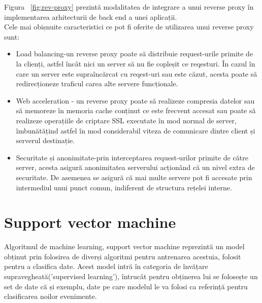 Figura ~\ref{fig:rev-proxy} prezintă modalitatea de integrare a unui reverse proxy în implementarea arhitecturii de back end a unei aplicații. \\

Cele mai obișnuite caracteristici ce pot fi oferite de utilizarea unui reverse proxy sunt: 
\begin{itemize}
	\item Load balancing-un reverse proxy poate să distribuie request-urile primite de la clienți, astfel încât nici un server să nu fie copleșit ce reqesturi. În cazul în care un server este supraîncărcat cu reqest-uri sau este căzut, acesta poate să redirecționeze traficul carea alte servere funcționale. 
	\item Web acceleration - un reverse proxy poate să realizeze compresia datelor sau să memoreze în memoria cache conținut ce este frecvent accesat sau poate să realizeze operațiile de criptare SSL executate în mod normal de server, îmbunătățind astfel în mod considerabil viteza de comunicare dintre client și serverul destinație. 
	\item  Securitate și anonimitate-prin interceptarea request-urilor primite de către server, acesta asigură anonimitatea serverului acționând că un nivel extra de securitate. De asemenea se asigură că mai multe servere pot fi accesate prin intermediul unui punct comun, indiferent de structura rețelei interne. 
\end{itemize}



\section{Support vector machine}

Algoritmul de machine learning, support vector machine reprezintă un model obținut prin folosirea de diverși algoritmi pentru antrenarea acestuia, folosit pentru a clasifica date. Acest model intră în categoria de învățare supravegheată('supervised learning'), întrucât pentru obținerea lui se folosește un set de date că și exemplu, date pe care modelul le va folosi ca referință pentru clasificarea noilor evenimente. 
  
